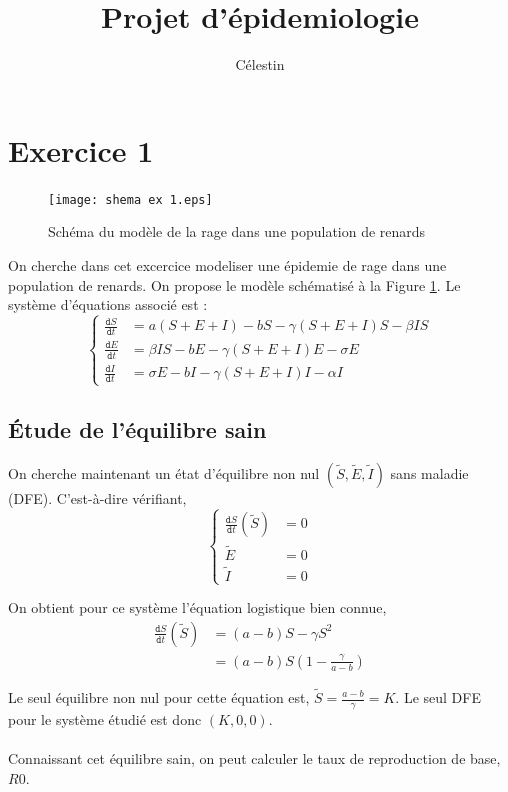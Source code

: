 \documentclass[11pt]{article}
\author{Célestin \bsc{BIGARR\'E}}
\title{Projet d'\'epidemiologie}
\newcommand{\deriv}{\texttt{d}}
\newcommand{\dt}[1]{\frac{\deriv #1}{\deriv t}}
\begin{document}
\maketitle

\section{Exercice 1}
\begin{figure}
	\centering
	\texttt{[image: shema ex 1.eps]}
	\caption{Sch\'ema du mod\`ele de la rage dans une population de renards}
	\label{fig:schema ex 1}
\end{figure}
On cherche dans cet excercice modeliser une \'epidemie de rage dans une population de renards. On propose le mod\`ele sch\'ematis\'e \`a la Figure \ref{fig:schema ex 1}. Le syst\`eme d'\'equations associ\'e est :
\[
\left\{
	\begin{aligned}
		\dt S &= a (S+E+I) -b S - \gamma (S+E+I)S - \beta I S\\
		\dt E &= \beta IS - b E - \gamma (S+E+I)E - \sigma E\\
		\dt I &=  \sigma E - b I - \gamma (S+E+I)I - \alpha I 
	\end{aligned}\right.
\]

\subsection{\'Etude de l'\'equilibre sain}

On cherche maintenant un \'etat d'\'equilibre non nul $(\tilde S, \tilde E, \tilde I)$ sans maladie (DFE). C'est-\`a-dire v\'erifiant,
\[
\left\{
	\begin{aligned}
		\dt S (\tilde S) &= 0\\
		\tilde E &= 0\\
		\tilde I &= 0
	\end{aligned}\right.
\]

On obtient pour ce syst\`eme l'\'equation logistique bien connue, 
\begin{align*}
	\dt S (\tilde S) &= (a-b) S - \gamma S^2\\
	&= (a-b) S (1 - \frac{\gamma}{a-b})
\end{align*}


Le seul \'equilibre non nul pour cette \'equation est, $\tilde S = \frac{a-b}{\gamma} = K$. Le seul DFE pour le syst\`eme \'etudi\'e est donc $(K, 0, 0)$.

\paragraph{} Connaissant cet \'equilibre sain, on peut calculer le taux de reproduction de base, $R0$. 
\end{document}
